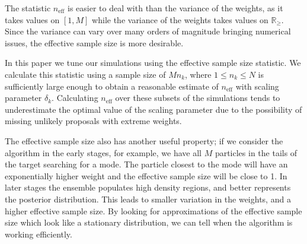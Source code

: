 \documentclass[final]{siamltex}
\newcommand{\neff}{n_{\text{eff}}}
\begin{document}
The statistic $\neff$ is easier to deal with than the variance of the
weights, as it takes values on $[1, M]$ while the variance of the
weights takes values on $\mathbb{R}_\geq$. Since the variance can vary
over many orders of magnitude bringing numerical issues, the effective
sample size is more desirable.


In this paper we tune our simulations using the effective sample size
statistic. We calculate this statistic using a sample size of $Mn_k$,
where $1 \leq n_k\leq N$ is sufficiently large enough to obtain a
reasonable estimate of $\neff$ with scaling parameter $\delta_k$.
Calculating $\neff$ over these subsets of the simulations tends to
underestimate the optimal value of the scaling parameter due to the
possibility of missing unlikely proposals with extreme weights.

The effective sample size also has another useful property; if we
consider the algorithm in the early stages, for example, we have all
$M$ particles in the tails of the target searching for a mode. The
particle closest to the mode will have an exponentially higher weight
and the effective sample size will be close to 1. In later stages the
ensemble populates high density regions, and better represents the
posterior distribution. This leads to smaller variation in the
weights, and a higher effective sample size. By looking for
approximations of the effective sample size which look like a
stationary distribution, we can tell when the algorithm is working
efficiently.
\end{document}
